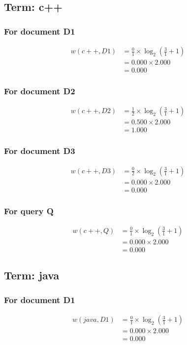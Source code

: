 \documentclass{article}
\begin{document}
\subsection{Term: c++}
\subsubsection*{For document D1}
\begin{align}
w(c++, D1) &= \frac{0}{1} \times \log_{2}\left(\frac{3}{1} + 1\right) \\
&= 0.000 \times 2.000 \\
&= 0.000
\end{align}

\subsubsection*{For document D2}
\begin{align}
w(c++, D2) &= \frac{1}{2} \times \log_{2}\left(\frac{3}{1} + 1\right) \\
&= 0.500 \times 2.000 \\
&= 1.000
\end{align}

\subsubsection*{For document D3}
\begin{align}
w(c++, D3) &= \frac{0}{2} \times \log_{2}\left(\frac{3}{1} + 1\right) \\
&= 0.000 \times 2.000 \\
&= 0.000
\end{align}

\subsubsection*{For query Q}
\begin{align}
w(c++, Q) &= \frac{0}{1} \times \log_{2}\left(\frac{3}{1} + 1\right) \\
&= 0.000 \times 2.000 \\
&= 0.000
\end{align}

\subsection{Term: java}
\subsubsection*{For document D1}
\begin{align}
w(java, D1) &= \frac{0}{1} \times \log_{2}\left(\frac{3}{1} + 1\right) \\
&= 0.000 \times 2.000 \\
&= 0.000
\end{align}
\end{document}
